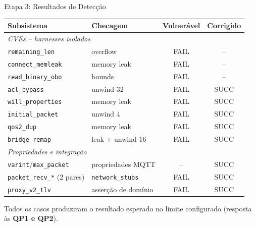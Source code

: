 \documentclass[10pt,aspectratio=169]{beamer}
\begin{document}
\begin{frame}{Etapa 3: Resultados de Detec\c{c}\~ao}
    \scriptsize
    \begin{tabular}{p{3.2cm}p{2.7cm}cc}
        \toprule
        Subsistema & Checagem & Vulner\'avel & Corrigido \\
        \midrule
        \multicolumn{4}{l}{\textit{CVEs -- harnesses isolados}} \\
        \texttt{remaining\_len}    & overflow       & \alert{FAIL} & -- \\
        \texttt{connect\_memleak}  & memory leak    & \alert{FAIL} & -- \\
        \texttt{read\_binary\_obo} & bounds         & \alert{FAIL} & -- \\
        \texttt{acl\_bypass}       & unwind 32      & \alert{FAIL} & SUCC \\
        \texttt{will\_properties}  & memory leak    & \alert{FAIL} & SUCC \\
        \texttt{initial\_packet}   & unwind 4       & \alert{FAIL} & SUCC \\
        \texttt{qos2\_dup}         & memory leak    & \alert{FAIL} & SUCC \\
        \texttt{bridge\_remap}     & leak + unwind 16 & \alert{FAIL} & SUCC \\
        \midrule
        \multicolumn{4}{l}{\textit{Propriedades e integra\c{c}\~ao}} \\
        \texttt{varint}/\texttt{max\_packet} & propriedades MQTT & -- & SUCC \\
        \texttt{packet\_recv\_*} (2 pares) & \texttt{network\_stubs} & \alert{FAIL} & SUCC \\
        \midrule
        \texttt{proxy\_v2\_tlv} & asser\c{c}\~ao de dom\'inio & \alert{FAIL} & SUCC \\
        \bottomrule
    \end{tabular}

    \vspace{0.4em}
    \small Todos os casos produziram o resultado esperado no limite configurado
    (resposta \`as \textbf{QP1 e QP2}).
\end{frame}
\end{document}
